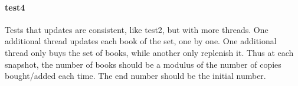 \documentclass[a4paper, 11pt]{article}
\begin{document}

\paragraph{test4} %
\label{par:test4}

Tests that updates are consistent, like test2, but with more threads. One additional thread updates each book of the set, one by one. One additional thread only buys the set of books, while another only replenish it. Thus at each snapshot, the number of books should be a modulus of the number of copies bought/added each time. The end number should be the initial number.


\end{document}
